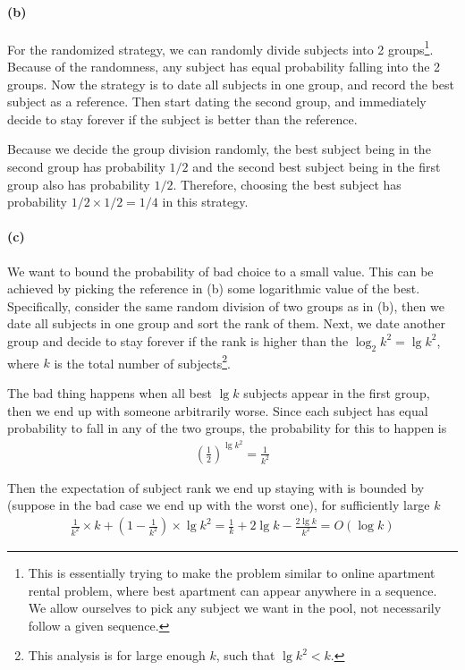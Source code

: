 \documentclass[12pt]{article}
\begin{document}
\paragraph{(b)} For the randomized strategy, we can randomly divide subjects into 2 groups\footnote{This is essentially trying to make the problem similar to online apartment rental problem, where best apartment can appear anywhere in a sequence. We allow ourselves to pick any subject we want in the pool, not necessarily follow a given sequence.}. Because of the randomness, any subject has equal probability falling into the 2 groups. Now the strategy is to date all subjects in one group, and record the best subject as a reference. Then start dating the second group, and immediately decide to stay forever if the subject is better than the reference. 

Because we decide the group division randomly, the best subject being in the second group has probability $1/2$ and the second best subject being in the first group also has probability $1/2$. Therefore, choosing the best subject has probability $1/2\times 1/2 = 1/4$ in this strategy.

\paragraph{(c)} We want to bound the probability of bad choice to a small value. This can be achieved by picking the reference in (b) some logarithmic value of the best. Specifically, consider the same random division of two groups as in (b), then we date all subjects in one group and sort the rank of them. Next, we date another group and decide to stay forever if the rank is higher than the $\log_2 k^2=\lg k^2$, where $k$ is the total number of subjects\footnote{This analysis is for large enough $k$, such that $\lg k^2 < k$.}. 

The bad thing happens when all best $\lg k$ subjects appear in the first group, then we end up with someone arbitrarily worse. Since each subject has equal probability to fall in any of the two groups, the probability for this to happen is 
\begin{align*}
\left(\frac{1}{2}\right)^{\lg k^2} = \frac{1}{k^2}
\end{align*}

Then the expectation of subject rank we end up staying with is bounded by (suppose in the bad case we end up with the worst one), for sufficiently large $k$
\begin{align*}
\frac{1}{k^2}\times k + \left(1-\frac{1}{k^2}\right) \times \lg k^2 = \frac{1}{k} + 2\lg k-\frac{2\lg k}{k^2} = O(\log k)
\end{align*}
\end{document}
